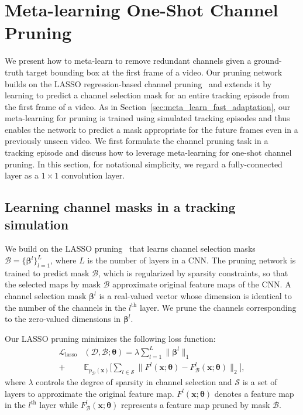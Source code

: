 \documentclass[letterpaper]{article} %
\def \x{\mathbf{x}}
\def \thetageneral{\boldsymbol{\theta}}
\def \losslasso{\mathcal{L}_\text{lasso}}
\begin{document}
\section{Meta-learning One-Shot Channel Pruning}

We present how to meta-learn to remove redundant channels given a ground-truth target bounding box at the first frame of a video.
Our pruning network builds on the LASSO regression-based channel pruning~\cite{he2017channel} and extends it by learning to predict a channel selection mask for an entire tracking episode from the first frame of a video.
As in Section~\ref{sec:meta_learn_fast_adaptation}, our meta-learning for pruning is trained using simulated tracking episodes and thus enables the network to predict a mask appropriate for the future frames even in a previously unseen video.
We first formulate the channel pruning task in a tracking episode and discuss how to leverage meta-learning for one-shot channel pruning.
In this section, for notational simplicity, we regard a fully-connected layer as a $1 \times 1$ convolution layer.

\subsection{Learning channel masks in a tracking simulation}
We build on the LASSO pruning~\cite{he2017channel} that learns channel selection masks $\mathcal{B}=\{\boldsymbol{\beta}^l\}_{l=1}^{L}$, where $L$ is the number of layers in a CNN.
The pruning network is trained to predict mask $\mathcal{B}$, which is regularized by sparsity constraints, so that the selected maps by mask $\mathcal{B}$ approximate original feature maps of the CNN.
A channel selection mask $\boldsymbol{\beta}^l$ is a real-valued vector whose dimension is identical to the number of the channels in the $l^\text{th}$ layer.
We prune the channels corresponding to the zero-valued dimensions in $\boldsymbol{\beta}^l$.

Our LASSO pruning minimizes the following loss function:
\begin{equation}
\begin{split}
\textstyle \losslasso&(\mathcal{D}, \mathcal{B} ; \thetageneral)
	= \textstyle  \lambda \sum_{l=1}^L\big\| \boldsymbol{\beta}^l\big\|_1
	\\
	+ & \textstyle \mathbb{E}_{p_{\mathcal{D}}(\x)} \Big[
		\sum_{l\in\mathcal{S}}
			\big\|F^l(\x; \boldsymbol{\theta}) -  F^l_\mathcal{B}(\x; \boldsymbol{\theta})\big\|_2  \Big]  ,
\label{eq:lasso_prune}
\end{split}
\end{equation}
where $\lambda$ controls the degree of sparsity in channel selection and $\mathcal{S}$ is a set of layers to approximate the original feature map.
$F^l(\x ; \boldsymbol{\theta})$ denotes a feature map in the $l^\text{th}$ layer while $F^l_ \mathcal{B}(\x; \boldsymbol{\theta})$ represents a feature map pruned by mask $\mathcal{B}$.
\end{document}
